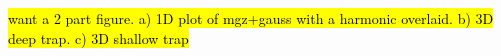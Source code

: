 \hl{want a 2 part figure. a) 1D plot of mgz+gauss with a harmonic overlaid. b) 3D deep trap. c) 3D shallow trap}

%
%
%
